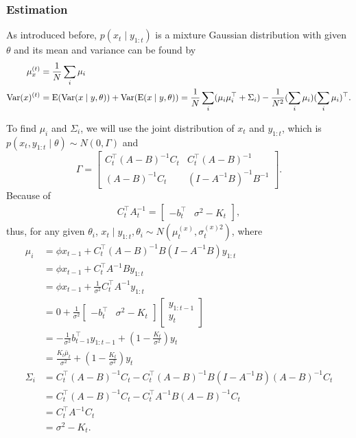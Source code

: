 \subsubsection*{Estimation}


As introduced before, $p(x_t \mid y_{1:t})$ is a mixture Gaussian distribution with given $\theta$ and its mean and variance can be found by 
\begin{align}
\mu_x^{(t)} &= \frac{1}{N} \sum_i \mu_i\\
\mathrm{Var}(x)^{(t)}  &= \mathrm{E}(\mathrm{Var}(x\mid y,\theta)) + \mathrm{Var}(\mathrm{E}(x\mid y,\theta)) = \frac{1}{N} \sum_i (\mu_i \mu_i^\top +\Sigma_i) -\frac{1}{N^2} (\sum_i  \mu_i) (\sum_i \mu_i)^\top. 
\end{align}

To find $\mu_i$ and $\Sigma_i$, we will use the joint distribution of $x_{t}$ and $y_{1:t}$, which is $p(x_{t}, y_{1:t}  \mid  \theta)\sim N(0,\Gamma)$ and 
\begin{equation*}
\Gamma=\begin{bmatrix} C_{t}^\top(A-B)^{-1}C_{t} & C_{t}^\top(A-B)^{-1}\\(A-B)^{-1}C_{t} & (I-A^{-1}B)^{-1}B^{-1} \end{bmatrix}.
\end{equation*}
Because of 
\begin{align*}
C_{t}^\top A_{t}^{-1} = \left[\begin{matrix} - b_{t}^\top & \sigma^2- K_{t} \end{matrix} \right],
\end{align*}
thus, for any given $\theta_i$, $x_{t}\mid y_{1:t},\theta_i \sim N(\mu_{t}^{(x)},\sigma_{t}^{(x)2})$, where
\begin{align*}
\mu_i  &= \phi \hat{x}_{t-1} +  C_{t}^\top (A-B)^{-1}B (I-A^{-1}B)y_{1:t}\\
                      &= \phi \hat{x}_{t-1} +  C_{t}^\top A^{-1}B y_{1:t} \\ &= \phi \hat{x}_{t-1} +  \frac{1}{\sigma^2}C_{t}^\top A^{-1} y_{1:t}\\
                      &=0+  \frac{1}{\sigma^2}\left[\begin{matrix} - b_{t}^\top & \sigma^2- K_{t} \end{matrix} \right]  \left[\begin{matrix} y_{1:t-1} \\ y_{t} \end{matrix} \right] \\
                      &= - \frac{1}{\sigma^2}b_{t-1}^\top y_{1:t-1}+(1-\frac{K_{t}}{\sigma^2})y_{t}\\
                      &=\frac{K_{t}\bar{\mu}_{t}}{\sigma^2}+(1-\frac{K_{t}}{\sigma^2})y_{t} \\
\Sigma_i&=C_{t}^\top(A-B)^{-1}C_{t}-  C_{t}^\top(A-B)^{-1}  B(I-A^{-1}B) (A-B)^{-1}C_{t}\\
                      &= C_{t}^\top(A-B)^{-1}C_{t} -  C_{t}^\top A^{-1}B(A-B)^{-1}C_{t}\\
                      &= C_{t}^\top A^{-1}C_{t} \\ &= \sigma^2-K_{t}.
\end{align*}
